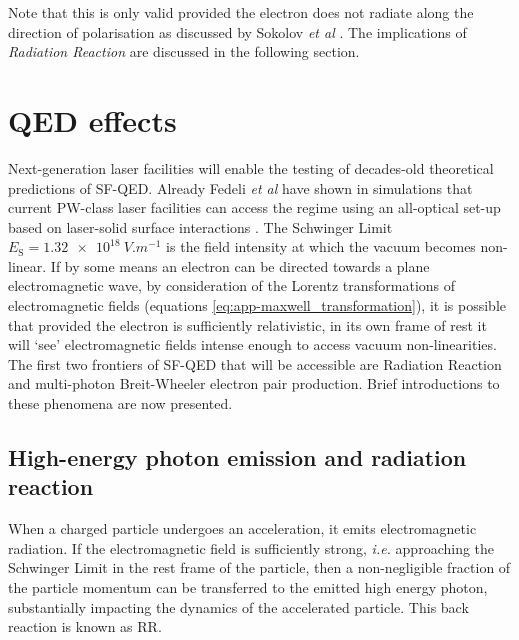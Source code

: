 Note that this is only valid provided the electron does not radiate along the direction of polarisation as discussed by Sokolov \textit{et al} \cite{sokolovDynamicsEmittingElectrons2009}. The implications of \textit{Radiation Reaction }are discussed in the following section.

\section{QED effects}
Next-generation laser facilities will enable the testing of decades-old theoretical predictions of \ac{SF-QED}. Already Fedeli \textit{et al} have shown in simulations that current PW-class laser facilities can access the regime using an all-optical set-up based on laser-solid surface interactions \cite{fedeliProbingStrongfieldQED2020}. The Schwinger Limit $E_\mathrm{S} = \qty{1.32e18}{V.m^{-1}}$ is the field intensity at which the vacuum becomes non-linear. If by some means an electron can be directed towards a plane electromagnetic wave, by consideration of the Lorentz transformations of electromagnetic fields (equations \ref{eq:app-maxwell_transformation}), it is possible that provided the electron is sufficiently relativistic, in its own frame of rest it will `see' electromagnetic fields intense enough to access vacuum non-linearities. The first two frontiers of SF-QED that will be accessible are Radiation Reaction and multi-photon Breit-Wheeler electron pair production. Brief introductions to these phenomena are now presented.

\subsection{High-energy photon emission and radiation reaction}
When a charged particle undergoes an acceleration, it emits electromagnetic radiation. If the electromagnetic field is sufficiently strong, \textit{i.e.} approaching the Schwinger Limit in the rest frame of the particle, then a non-negligible fraction of the particle momentum can be transferred to the emitted high energy photon, substantially impacting the dynamics of the accelerated particle. This back reaction is known as \ac{RR}.

